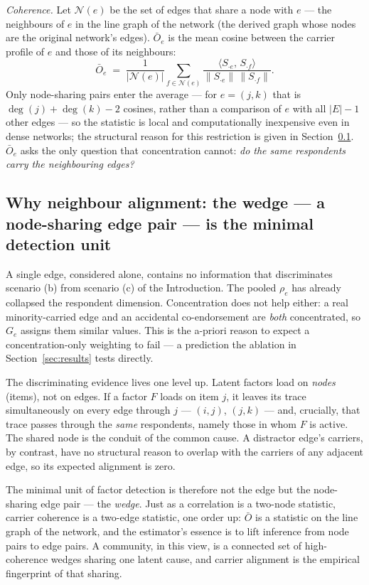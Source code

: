 \documentclass[11pt]{article}
\newcommand{\Obar}{\bar{O}}
\begin{document}
\emph{Coherence.} Let $\mathcal{N}(e)$ be the set of edges that share a node with
$e$ --- the neighbours of $e$ in the line graph of the network (the
derived graph whose nodes are the original network's edges). $\Obar_e$ is
the mean cosine between the carrier profile of $e$ and those of its
neighbours:
\begin{equation}
\Obar_e \;=\; \frac{1}{|\mathcal{N}(e)|}\sum_{f\in \mathcal{N}(e)}
\frac{\langle S_{\cdot e},\,S_{\cdot f}\rangle}
     {\lVert S_{\cdot e}\rVert\,\lVert S_{\cdot f}\rVert}.
\label{eq:obar}
\end{equation}
Only node-sharing pairs enter the average --- for $e=(j,k)$ that is
$\deg(j)+\deg(k)-2$ cosines, rather than a comparison of $e$ with all
$|E|-1$ other edges --- so the statistic is local and computationally
inexpensive even in dense networks; the structural reason
for this restriction is given in Section~\ref{sec:wedge}. $\Obar_e$ asks the
only question that concentration cannot: \emph{do the same respondents carry
the neighbouring edges?}

\subsection{Why neighbour alignment: the wedge --- a node-sharing edge
pair --- is the minimal detection unit}
\label{sec:wedge}
A single edge, considered alone, contains no information that discriminates
scenario (b) from scenario (c) of the Introduction. The pooled $\rho_e$ has
already collapsed the respondent dimension. Concentration does not help
either: a real minority-carried edge and an accidental co-endorsement are
\emph{both} concentrated, so $G_e$ assigns them similar values. This is the
a-priori reason to expect a concentration-only weighting to fail --- a
prediction the ablation in Section~\ref{sec:results} tests directly.

The discriminating evidence lives one level up. Latent factors load on
\emph{nodes} (items), not on edges. If a factor $F$ loads on item $j$, it
leaves its trace simultaneously on every edge through $j$ --- $(i,j)$,
$(j,k)$ --- and, crucially, that trace passes through the \emph{same}
respondents, namely those in whom $F$ is active. The shared node is the
conduit of the common cause. A distractor edge's carriers, by contrast, have
no structural reason to overlap with the carriers of any adjacent edge, so
its expected alignment is zero.

The minimal unit of factor detection is therefore not the edge but the
node-sharing edge pair --- the \emph{wedge}. Just as a correlation is a
two-node statistic, carrier coherence is a two-edge statistic, one order up:
$\Obar$ is a statistic on the line graph of the network, and the estimator's
essence is to lift inference from node pairs to edge pairs. A community, in
this view, is a connected set of high-coherence wedges sharing one latent
cause, and carrier alignment is the empirical fingerprint of that sharing.
\end{document}
